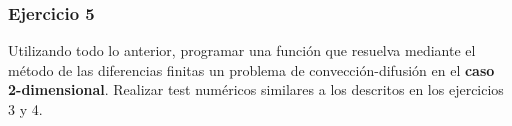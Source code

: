 \documentclass[11pt,spanish,a4wide]{article}
\begin{document}
\subsubsection{Ejercicio 5}
Utilizando todo lo anterior, programar una función que resuelva
mediante el método de las diferencias finitas un problema de
convección-difusión en el \textbf{caso 2-dimensional}. Realizar test
numéricos similares a los descritos en los ejercicios 3 y 4.
\end{document}
